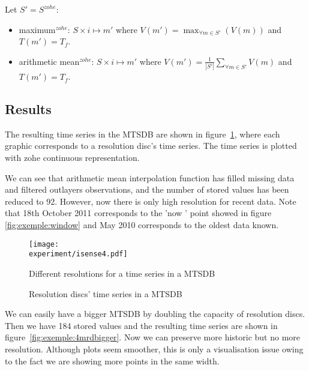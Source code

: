 Let $S'=S^{zohe}$:
\begin{itemize}
\item maximum$^{zohe}$: $S \times i \mapsto m'$ where $V(m') =
  \max_{\forall m \in S'}(V(m))$ and $T(m')=T_f$.
\item arithmetic mean$^{zohe}$: $S \times i \mapsto m'$ where $V(m')
  = \frac{1}{|S'|} \sum\limits_{\forall m\in S'} V(m)$ and
  $T(m')=T_f$. 
\end{itemize}







\subsection{Results}

The resulting time series in the MTSDB are shown in
figure~\ref{fig:exemple:4mrd}, where each graphic corresponds to a
resolution disc's time series. The time series is plotted with zohe
continuous representation.


We can see that arithmetic mean
interpolation function has filled missing data and filtered outlayers
observations, and the number of stored values has
been reduced to 92. However, now there is only high resolution for
recent data. Note that 18th October 2011 corresponds to the 'now '
point showed in figure \ref{fig:exemple:window} and May 2010
corresponds to the oldest data known.

\begin{figure}[tp]
\centering
\texttt{[image: \\experiment/isense4.pdf]}
\caption{Different resolutions for a time series in a MTSDB}
\label{fig:exemple:4mrd}
\end{figure}

\begin{figure}[tp]
  \centering
  \scriptsize
  
  \caption{Resolution discs' time series in a MTSDB}
  \label{fig:exemple:original}
\end{figure}



We can easily have a bigger MTSDB by doubling the capacity of
resolution discs. Then we have 184 stored values and the resulting
time series are shown in figure~\ref{fig:exemple:4mrdbigger}.  Now we
can preserve more historic but no more resolution. Although plots seem
smoother, this is only a visualisation issue owing to the fact we are
showing more points in the same width.

